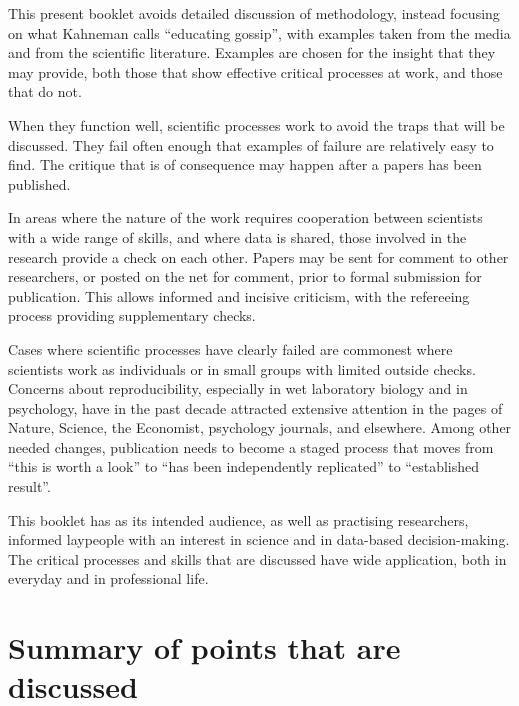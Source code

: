\documentclass[
  10pt,
  b5paper]{book}
\begin{document}
This present booklet avoids detailed discussion of methodology,
instead focusing on what Kahneman calls ``educating gossip'', with
examples taken from the media and from the scientific literature.
Examples are chosen for the insight that they may provide, both
those that show effective critical processes at work, and those
that do not.

When they function well, scientific processes work to avoid the
traps that will be discussed. They fail often enough that
examples of failure are relatively easy to find. The critique
that is of consequence may happen after a papers has been
published.

In areas where the nature of the work requires cooperation between
scientists with a wide range of skills, and where data is shared,
those involved in the research provide a check on each other.
Papers may be sent for comment to other researchers, or posted on
the net for comment, prior to formal submission for publication.
This allows informed and incisive criticism, with the refereeing
process providing supplementary checks.

Cases where scientific processes have clearly failed are
commonest where scientists work as individuals or in small groups
with limited outside checks. Concerns about reproducibility,
especially in wet laboratory biology and in psychology, have in
the past decade attracted extensive attention in the pages of
Nature, Science, the Economist, psychology journals, and elsewhere.
Among other needed changes, publication needs to become a staged
process that moves from ``this is worth a look'' to ``has been
independently replicated'' to ``established result''.

This booklet has as its intended audience, as well as practising
researchers, informed laypeople with an interest in science and
in data-based decision-making. The critical processes and skills
that are discussed have wide application, both in everyday and
in professional life.

\hypertarget{summary-of-points-that-are-discussed}{%
\chapter*{Summary of points that are discussed}\label{summary-of-points-that-are-discussed}}
\end{document}
